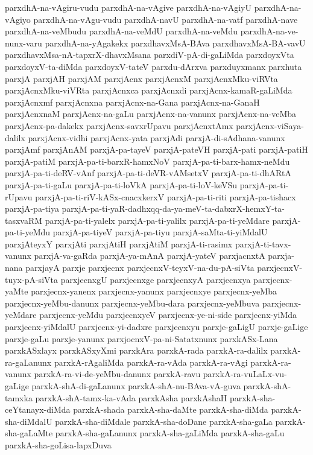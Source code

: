 {parxdhA-na-vAgiru-vudu
parxdhA-na-vAgive
parxdhA-na-vAgiyU
parxdhA-na-vAgiyo
parxdhA-na-vAgu-vudu
parxdhA-navU
parxdhA-na-vatf
parxdhA-nave
parxdhA-na-veMbudu
parxdhA-na-veMdU
parxdhA-na-veMdu
parxdhA-na-ve-nunx-varu
parxdhA-na-yAgakekx
parxdhavxMsA-BAva
parxdhavxMsA-BA-vavU
parxdhavxMsa-nA-tapxrX-dhavxMsana
parxdiV-pA-di-gaLiMda
parxdoyxVta
parxdoyxV-ta-diMda
parxdoyxV-tateV
parxdu-dArxva
parxduyxmanx
parxhuta
parxjA
parxjAH
parxjAM
parxjAcnx
parxjAcnxM
parxjAcnxMku-viRVta
parxjAcnxMku-viVRta
parxjAcnxca
parxjAcnxdi
parxjAcnx-kamaR-gaLiMda
parxjAcnxmf
parxjAcnxna
parxjAcnx-na-Gana
parxjAcnx-na-GanaH
parxjAcnxnaM
parxjAcnx-na-gaLu
parxjAcnx-na-vanunx
parxjAcnx-na-veMba
parxjAcnx-pa-dakekx
parxjAcnx-savxrUpavu
parxjAcnxtAmx
parxjAcnx-viSaya-dalilx
parxjAcnx-vidhi
parxjAcnx-yata
parxjAdi
parxjA-di-sAdhana-vanunx
parxjAmf
parxjAnAM
parxjA-pa-tayeV
parxjA-pateVH
parxjA-pati
parxjA-patiH
parxjA-patiM
parxjA-pa-ti-barxR-hamxNoV
parxjA-pa-ti-barx-hamx-neMdu
parxjA-pa-ti-deRV-vAnf
parxjA-pa-ti-deVR-vAMsetxV
parxjA-pa-ti-dhARtA
parxjA-pa-ti-gaLu
parxjA-pa-ti-loVkA
parxjA-pa-ti-loV-keVSu
parxjA-pa-ti-rUpavu
parxjA-pa-ti-riV-kASx-cnacxkerxV
parxjA-pa-ti-riti
parxjA-pa-tishacx
parxjA-pa-tiya
parxjA-pa-ti-yaR-dadhxqq-da-ya-meV-ta-dabxrX-hemxY-ta-tasxvaRM
parxjA-pa-ti-yalelx
parxjA-pa-ti-yalilx
parxjA-pa-ti-yeMdare
parxjA-pa-ti-yeMdu
parxjA-pa-tiyeV
parxjA-pa-tiyu
parxjA-saMta-ti-yiMdalU
parxjAteyxY
parxjAti
parxjAtiH
parxjAtiM
parxjA-ti-rasimx
parxjA-ti-tavx-vanunx
parxjA-va-gaRda
parxjA-ya-mAnA
parxjA-yateV
parxjacnxtA
parxja-nana
parxjayA
parxje
parxjecnx
parxjecnxV-teyxV-na-du-pA-siVta
parxjecnxV-tuyx-pA-siVta
parxjecnxgU
parxjecnxge
parxjecnxyA
parxjecnxya
parxjecnx-yaMte
parxjecnx-yanenx
parxjecnx-yanunx
parxjecnxye
parxjecnx-yeMba
parxjecnx-yeMbu-danunx
parxjecnx-yeMbu-dara
parxjecnx-yeMbuva
parxjecnx-yeMdare
parxjecnx-yeMdu
parxjecnxyeV
parxjecnx-ye-ni-side
parxjecnx-yiMda
parxjecnx-yiMdalU
parxjecnx-yi-dadxre
parxjecnxyu
parxje-gaLigU
parxje-gaLige
parxje-gaLu
parxje-yanunx
parxjocnxV-pa-ni-Satatxnunx
parxkASx-Lana
parxkASxlayx
parxkASxyXmi
parxkAra
parxkA-rada
parxkA-ra-dalilx
parxkA-ra-gaLanunx
parxkA-rAgaliMda
parxkA-ra-vAda
parxkA-ra-vAgi
parxkA-ra-vanunx
parxkA-ra-vi-de-yeMbu-danunx
parxkA-ravu
parxkA-ra-vuLaLx-vu-gaLige
parxkA-shA-di-gaLanunx
parxkA-shA-nu-BAva-vA-guva
parxkA-shA-tamxka
parxkA-shA-tamx-ka-vAda
parxkAsha
parxkAshaH
parxkA-sha-ceYtanayx-diMda
parxkA-shada
parxkA-sha-daMte
parxkA-sha-diMda
parxkA-sha-diMdalU
parxkA-sha-diMdale
parxkA-sha-doDane
parxkA-sha-gaLa
parxkA-sha-gaLaMte
parxkA-sha-gaLanunx
parxkA-sha-gaLiMda
parxkA-sha-gaLu
parxkA-sha-goLisa-lapxDuva
}
